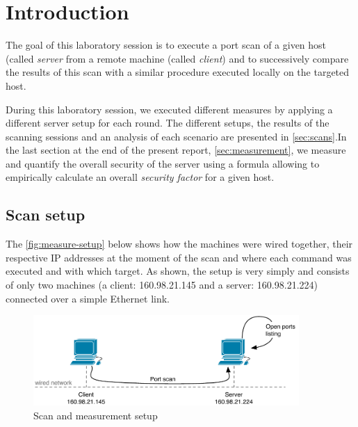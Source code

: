 \documentclass[10pt,a4paper,twoside,onecolumn]{article}
\begin{document}



\cleardoublepage
\setcounter{page}{1}

\section{Introduction}

The goal of this laboratory session is to execute a port scan of a given host (called \textit{server} from a remote machine (called \textit{client}) and to successively compare the results of this scan with a similar procedure executed locally on the targeted host.

During this laboratory session, we executed different measures by applying a different server setup for each round. The different setups, the results of the scanning sessions and an analysis of each scenario are presented in \autoref{sec:scans}.In the last section at the end of the present report, \autoref{sec:measurement}, we measure and quantify the overall security of the server using a formula allowing to empirically calculate an overall \textit{security factor} for a given host.

\subsection{Scan setup}

The \autoref{fig:measure-setup} below shows how the machines were wired together, their respective IP addresses at the moment of the scan and where each command was executed and with which target. As shown, the setup is very simply and consists of only two machines (a client: 160.98.21.145 and a server: 160.98.21.224) connected over a simple Ethernet link.

\begin{figure}[ht]
	\centering
	\includegraphics[width=0.9\textwidth]{images/measure-setup}
	\caption{Scan and measurement setup}
	\label{fig:measure-setup}
\end{figure}
\end{document}
